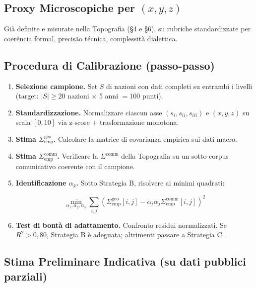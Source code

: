 \subsection{\texorpdfstring{Proxy Microscopiche per
\((x, y, z)\)}{Proxy Microscopiche per (x, y, z)}}\label{proxy-microscopiche-per-x-y-z}

Già definite e misurate nella Topografia (\S{}4 e \S{}6), su rubriche
standardizzate per coerência formal, precisão técnica, complessità
dialettica.

\subsection{Procedura di Calibrazione
(passo-passo)}\label{procedura-di-calibrazione-passo-passo}

\begin{enumerate}
\def\labelenumi{\arabic{enumi}.}
\item
  \textbf{Selezione campione.} Set \(S\) di nazioni con dati completi su
  entrambi i livelli (target: \(|S| \geq 20\) nazioni $\times$ 5 anni \(= 100\)
  punti).
\item
  \textbf{Standardizzazione.} Normalizzare ciascun asse
  \((s_i, s_{ii}, s_{iii})\) e \((x, y, z)\) su scala \([0, 10]\) via
  z-score + trasformazione monotona.
\item
  \textbf{Stima \(\Sigma^{\text{geo}}_{\text{emp}}\).} Calcolare la
  matrice di covarianza empirica sui dati macro.
\item
  \textbf{Stima \(\Sigma^{\text{comm}}_{\text{emp}}\).} Verificare la
  \(\Sigma^{\text{comm}}\) della Topografia su un sotto-corpus
  comunicativo coerente con il campione.
\item
  \textbf{Identificazione \(\alpha_k\).} Sotto Strategia B, risolvere ai
  minimi quadrati:

  \[\min_{\alpha_1, \alpha_2, \alpha_3} \sum_{i, j} \left( \Sigma^{\text{geo}}_{\text{emp}}[i,j] - \alpha_i \alpha_j \Sigma^{\text{comm}}_{\text{emp}}[i,j] \right)^2\]
\item
  \textbf{Test di bontà di adattamento.} Confronto residui normalizzati.
  Se \(R^2 > 0{,}80\), Strategia B è adeguata; altrimenti passare a
  Strategia C.
\end{enumerate}

\subsection{Stima Preliminare Indicativa (su dati pubblici
parziali)}\label{stima-preliminare-indicativa-su-dati-pubblici-parziali}

